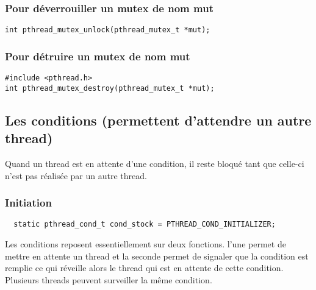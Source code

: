 \documentclass[a4paper]{article}
\begin{document}
\subsubsection{Pour déverrouiller un mutex de nom mut}
\begin{lstlisting}
int pthread_mutex_unlock(pthread_mutex_t *mut);
\end{lstlisting}
\subsubsection{Pour détruire un mutex de nom mut}
\begin{lstlisting}
#include <pthread.h>
int pthread_mutex_destroy(pthread_mutex_t *mut);
\end{lstlisting}
\subsection{Les conditions (permettent d'attendre un autre thread)}
Quand un thread est en attente d'une condition, il reste bloqué tant que celle-ci n'est pas réalisée par un autre thread.
\subsubsection{Initiation}
\begin{lstlisting}
  static pthread_cond_t cond_stock = PTHREAD_COND_INITIALIZER;
\end{lstlisting}
Les conditions reposent essentiellement sur deux fonctions.
l'une permet de mettre en attente un thread et la seconde permet de signaler que la condition est remplie ce qui réveille alors le thread qui est en attente de cette condition.
Plusieurs threads peuvent surveiller la même condition.
\newpage
\end{document}
